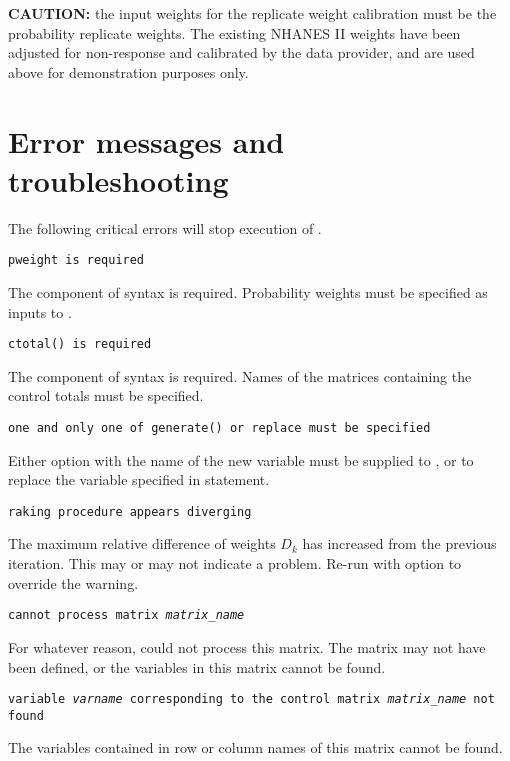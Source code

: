 {\bf CAUTION:} the input weights for the replicate weight calibration
must be the probability replicate weights. The existing NHANES II weights
have been adjusted for non-response and calibrated by the data provider,
and are used above for demonstration purposes only.

\section{Error messages and troubleshooting}
\label{subsec:tbshooting}

The following critical errors will stop execution of
.

\noindent
{\tt pweight is required}

\morehang
    The \stcmd{[pweight=\ldots]} component of 
    syntax is required. Probability weights must be specified as
    inputs to .

\noindent
    {\tt ctotal() is required}

    \morehang
    The  component of 
    syntax is required. Names of the matrices containing the
    control totals must be specified.

    \noindent
    {\tt one and only one of generate() or replace must be specified}

    \morehang
    Either  option with the name of the new variable
    must be supplied to , or  to replace
    the variable specified in \stcmd{[pw=\ldots]} statement.

    \noindent
    {\tt raking procedure appears diverging}

    \morehang
    The maximum relative difference of weights $D_k$ has increased from
    the previous
    iteration. This may or may not indicate a problem. Re-run 
    with  option to override the warning.

    \noindent
    {\tt cannot process matrix {\it matrix{\_}name}}

    \morehang
    For whatever reason,  could not process this matrix.
    The matrix may not have been defined, or the variables in this matrix
    cannot be found.

    \noindent
    {\tt variable {\it varname} corresponding to the control matrix
    {\it matrix{\_}name} not found}

    \morehang
    The variables contained in row or column names of this matrix
    cannot be found.

